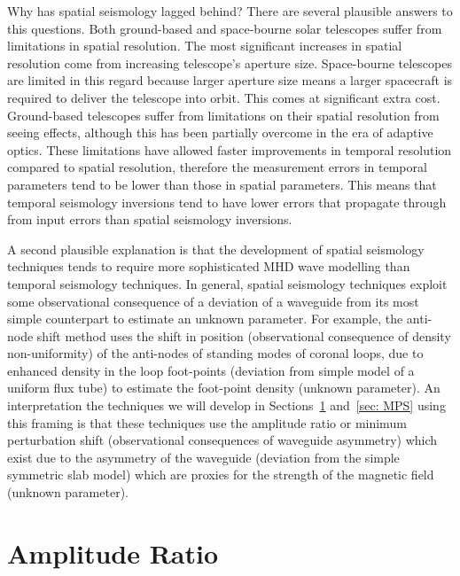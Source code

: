 Why has spatial seismology lagged behind? There are several plausible answers to this questions. Both ground-based and space-bourne solar telescopes suffer from limitations in spatial resolution. The most significant increases in spatial resolution come from increasing telescope's aperture size. Space-bourne telescopes are limited in this regard because larger aperture size means a larger spacecraft is required to deliver the telescope into orbit. This comes at significant extra cost. Ground-based telescopes suffer from limitations on their spatial resolution from seeing effects, although this has been partially overcome in the era of adaptive optics. These limitations have allowed faster improvements in temporal resolution compared to spatial resolution, therefore the measurement errors in temporal parameters tend to be lower than those in spatial parameters. This means that temporal seismology inversions tend to have lower errors that propagate through from input errors than spatial seismology inversions.

A second plausible explanation is that the development of spatial seismology techniques tends to require more sophisticated MHD wave modelling than temporal seismology techniques. In general, spatial seismology techniques exploit some observational consequence of a deviation of a waveguide from its most simple counterpart to estimate an unknown parameter. For example, the anti-node shift method uses the shift in position (observational consequence of density non-uniformity) of the anti-nodes of standing modes of coronal loops, due to enhanced density in the loop foot-points (deviation from simple model of a uniform flux tube) to estimate the foot-point density (unknown parameter). An interpretation the techniques we will develop in Sections~\ref{sec: AR} and~\ref{sec: MPS} using this framing is that these techniques use the amplitude ratio or minimum perturbation shift (observational consequences of waveguide asymmetry) which exist due to the asymmetry of the waveguide (deviation from the simple symmetric slab model) which are proxies for the strength of the magnetic field (unknown parameter).


\section{Amplitude Ratio}
\label{sec: AR}

